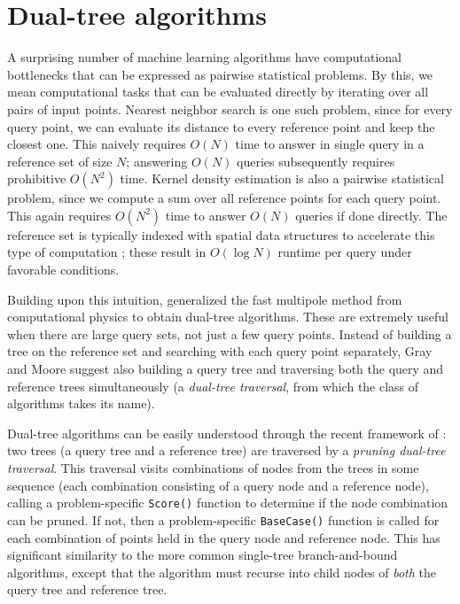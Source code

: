 \documentclass[twoside,11pt]{article} %
\begin{document}
\section{Dual-tree algorithms}

A surprising number of machine learning algorithms have computational
bottlenecks that can be expressed as pairwise statistical problems.
By this, we mean computational tasks that can be evaluated directly by iterating over all
pairs of input points.
Nearest neighbor search is one such problem, since for every query point, we can
evaluate its distance to every reference point and keep the closest one.
This naively requires $O(N)$ time
to answer in single query in a reference set of size $N$; answering $O(N)$
queries subsequently requires prohibitive $O(N^2)$ time. Kernel density
estimation is also a pairwise statistical problem, since we compute a sum over all
reference points for each query point.
This again requires $O(N^2)$
time to answer $O(N)$ queries if done directly.
The reference set is typically indexed with
spatial data structures to accelerate this type of computation
\citep{finkel1974quad, langford2006}; these result in $O(\log N)$ runtime per
query under favorable conditions.

Building upon this intuition, \citet{nbody} generalized the fast multipole
method from computational physics to obtain dual-tree algorithms.  These are
extremely useful when there are large query sets, not just a few query points.
Instead of building a tree on the reference set and searching with each query
point separately, Gray and Moore suggest also building a query tree and
traversing both the query and reference trees simultaneously (a {\it dual-tree
traversal}, from which the class of algorithms takes its name).

Dual-tree algorithms can be easily understood through the recent framework of
\citet{curtin2013tree}: two trees (a query tree and a reference
tree) are traversed by a {\it pruning dual-tree traversal}.  This traversal
visits combinations of nodes from the trees in some sequence (each combination
consisting of a query node and a reference node), calling a problem-specific
\texttt{Score()} function to determine if the node combination can be pruned.
If not, then a problem-specific \texttt{BaseCase()} function is called for each
combination of points held in the query node and reference node.  This has
significant similarity to the more common single-tree branch-and-bound
algorithms, except that the algorithm must recurse into child nodes of {\it
both} the query tree and reference tree.
\end{document}
